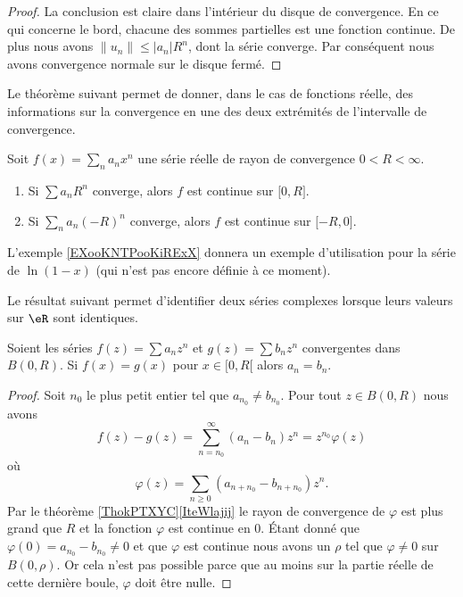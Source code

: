 \begin{proof}
    La conclusion est claire dans l'intérieur du disque de convergence. En ce qui concerne le bord, chacune des sommes partielles est une fonction continue. De plus nous avons \( \| u_n \|\leq | a_n |R^n\), dont la série converge. Par conséquent nous avons convergence normale sur le disque fermé.
\end{proof}

Le théorème suivant permet de donner, dans le cas de fonctions réelle, des informations sur la convergence en une des deux extrémités de l'intervalle de convergence.
\begin{theorem} \label{ThoLUXVjs}
    Soit \( f(x)=\sum_na_nx^n\) une série réelle de rayon de convergence \( 0<R<\infty\).
    \begin{enumerate}
        \item
            Si \( \sum a_nR^n\) converge, alors \( f\) est continue sur \( \mathopen[ 0 , R \mathclose]\).
        \item
            Si \( \sum_na_n(-R)^n\) converge, alors \( f\) est continue sur \( \mathopen[ -R , 0 \mathclose]\).
    \end{enumerate}
\end{theorem}

L'exemple \ref{EXooKNTPooKiRExX} donnera un exemple d'utilisation pour la série de \( \ln(1-x)\) (qui n'est pas encore définie à ce moment).


Le résultat suivant permet d'identifier deux séries complexes lorsque leurs valeurs sur \( \eR\) sont identiques.
\begin{proposition}
    Soient les séries \( f(z)=\sum a_nz^n\) et \( g(z)=\sum b_n z^n\) convergentes dans \( B(0,R)\). Si \( f(x)=g(x)\) pour \( x\in \mathopen[ 0 , R [\) alors \( a_n=b_n\).
\end{proposition}

\begin{proof}
    Soit \( n_0\) le plus petit entier tel que \( a_{n_0}\neq b_{n_0}\). Pour tout \( z\in B(0,R)\) nous avons
    \begin{equation}
        f(z)-g(z)=\sum_{n=n_0}^{\infty}(a_n-b_n)z^n=z^{n_0}\varphi(z)
    \end{equation}
    où
    \begin{equation}
        \varphi(z)=\sum_{n\geq 0}(a_{n+n_0}-b_{n+n_0})z^n.
    \end{equation}
    Par le théorème \ref{ThokPTXYC}\ref{IteWlajij} le rayon de convergence de \( \varphi\) est plus grand que \( R\) et la fonction \( \varphi\) est continue en \( 0\). Étant donné que \( \varphi(0)=a_{n_0}-b_{n_0}\neq 0\) et que \( \varphi\) est continue nous avons un \( \rho\) tel que \( \varphi\neq 0\) sur \( B(0,\rho)\). Or cela n'est pas possible parce que au moins sur la partie réelle de cette dernière boule, \( \varphi\) doit être nulle.
\end{proof}


